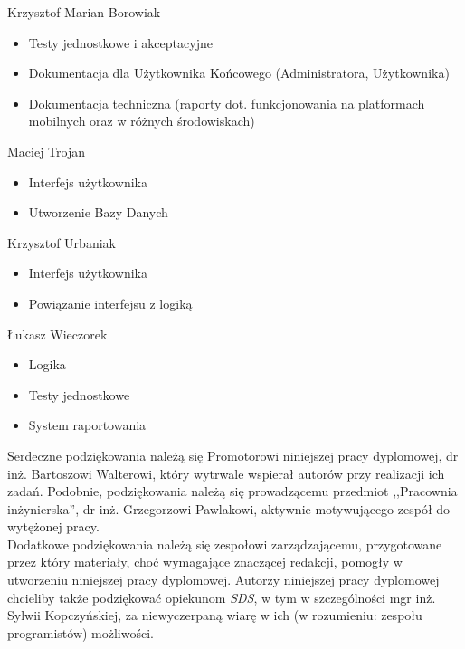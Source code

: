 \begin{description}
\item Krzysztof Marian Borowiak

\begin{itemize}
\item Testy jednostkowe i akceptacyjne
\item Dokumentacja dla Użytkownika Końcowego (Administratora, Użytkownika)
\item Dokumentacja techniczna (raporty dot. funkcjonowania na platformach mobilnych oraz w różnych środowiskach)
\end{itemize}
\noindent

\item Maciej Trojan

\begin{itemize}
\item Interfejs użytkownika
\item Utworzenie Bazy Danych
\end{itemize}
\noindent

\item Krzysztof Urbaniak

\begin{itemize}
\item Interfejs użytkownika
\item Powiązanie interfejsu z logiką
\end{itemize}
\noindent

\item Łukasz Wieczorek

\begin{itemize}
\item Logika
\item Testy jednostkowe
\item System raportowania
\end{itemize}
\noindent

\end{description}

Serdeczne podziękowania należą się Promotorowi niniejszej pracy dyplomowej, dr inż. Bartoszowi Walterowi, który  wytrwale wspierał autorów przy realizacji ich zadań. Podobnie, podziękowania należą się prowadzącemu przedmiot ,,Pracownia inżynierska'', dr inż. Grzegorzowi Pawlakowi, aktywnie motywującego zespół do wytężonej pracy. \\

Dodatkowe podziękowania należą się zespołowi zarządzającemu, przygotowane przez który materiały, choć wymagające znaczącej redakcji, pomogły w utworzeniu niniejszej pracy dyplomowej. Autorzy niniejszej pracy dyplomowej chcieliby także podziękować opiekunom \textit{SDS}, w tym w szczególności mgr inż. Sylwii Kopczyńskiej, za niewyczerpaną wiarę w ich (w rozumieniu: zespołu programistów) możliwości.

